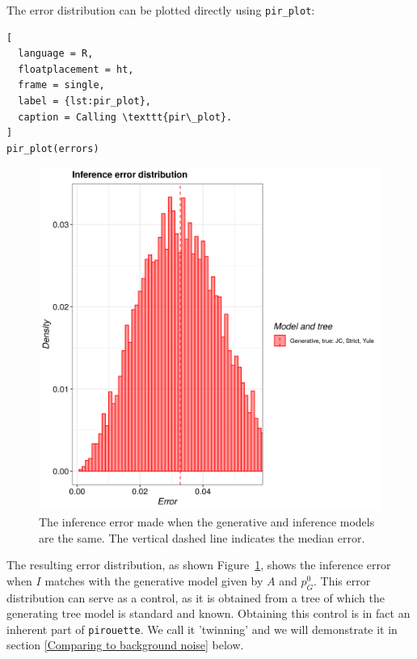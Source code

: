 The error distribution can be plotted directly using \verb;pir_plot;:

\begin{lstlisting}[
  language = R,
  floatplacement = ht,
  frame = single,
  label = {lst:pir_plot},
  caption = Calling \texttt{pir\_plot}.
]
pir_plot(errors)
\end{lstlisting}

\begin{figure}[H]
  \includegraphics[width=\textwidth]{pirouette_example_1/example_1_314/errors.png}
  \caption{
    The inference error made 
    when the generative and inference models are the same.
    The vertical dashed line indicates the median error.
  }
  \label{fig:example_1}
\end{figure}

The resulting error distribution, as shown Figure~\ref{fig:example_1},
shows the inference error 
when $\mathit{I}$ matches with the generative model given 
by $\mathit{A}$ and $\mathit{p_{G}^0}$.
This error distribution can serve as a control,
as it is obtained from a tree of which the generating tree model is standard and known.
Obtaining this control is in fact an inherent part of \verb;pirouette;. 
We call it 'twinning' and we will demonstrate it in section
\ref{Comparing to background noise} below.

